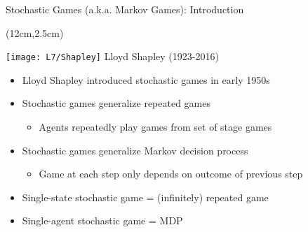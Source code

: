 \documentclass[11pt,aspectratio=169,handout]{beamer}
\begin{document}
  \begin{frame}{Stochastic Games (a.k.a. Markov Games): Introduction}
   \begin{textblock*}{3cm}(12cm,2.5cm)
    \begin{center}\tiny
     \texttt{[image: L7/Shapley]}
     \vspace{5pt}
     Lloyd Shapley (1923-2016)
    \end{center}
   \end{textblock*}
   \vspace{2em}
   \begin{itemize}[<+->]
   \setlength{\itemsep}{1em}
    \item Lloyd Shapley introduced stochastic games in early 1950s
    \item Stochastic games generalize repeated games
    \begin{itemize}
     \item Agents repeatedly play games from set of stage games
    \end{itemize}
    \item Stochastic games generalize Markov decision process
    \begin{itemize}
     \item Game at each step only depends on outcome of previous step
    \end{itemize}
    \item \alert{Single-state} stochastic game = (infinitely) repeated game
    \item \alert{Single-agent} stochastic game = MDP
   \end{itemize}
  \end{frame}
  
\end{document}
